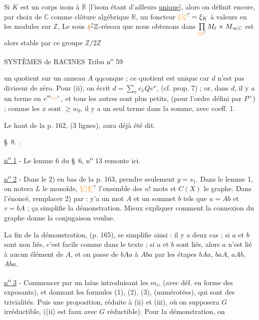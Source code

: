 Si $K$ est un corps  isom à $\mathbb R$ [l'isom étant d'ailleurs \uline{unique}], alors on définit encore, par choix de $\mathbb C$ comme  clôture algébrique  $\mathbb R$, un foncteur $\unsure{\xi|\zeta}=\xi_K$ à valeurs en les modules sur $\mathbb Z$,   Le sous $\deleted{\unsure{\xi}}\mathbb Z$-réseau  que nous obtenons dans $\prod\limits_{\unsure{\ell|l}} M_\ell\times M_\infty{}_{\mathbb C}$  est alors stable par ce groupe $\mathbb Z/2\mathbb Z$

SYSTÈMES de RACINES \hfill Tribu n\textsuperscript{o} 59

un quotient sur un anneau $A$ qqconque ; ce quotient est unique car $d$ n'est pas diviseur de zéro. Pour (ii), on écrit $d=\sum\limits_x c_x Qe^x$, (cf. prop. 7) ; or, dans $d$, il y a un terme en $e^{w_{\unsure{0|o}}}$, et tous les autres sont plus petits, (pour l'ordre défini par $P^+$) ; comme les $x$ sont $\geq w_0$, il y a un seul terme dans la somme, avec coeff. 1.

Le haut de la p. 162, (3 lignes), aura déjà été dit.

\S~8. .

\uline{n\textsuperscript{o} 1} - Le lemme 6 du \S~6, n\textsuperscript{o} 13 remonte ici.

\uline{n\textsuperscript{o} 2} - Dans le 2) en bas de la p. 163, prendre seulement $g=s_1$. Dans le lemme 1, on notera $L$ le monoïde, $\unsure{\underline V|\underline Y}$ l'ensemble des $n!$ mots et $C(X)$ le graphe. Dans l'énoncé, remplacer 2) par : \textquotedbl{} y'a un mot $A$ et un sommet $b$ tels que $u=Ab$ et $v=bA$ \textquotedbl{} ; ça simplifie la démonstration. Mieux expliquer comment la connexion du graphe donne la conjugaison voulue.

La fin de la démonstration, (p. 165), se simplifie ainsi : il y a deux cas ; si $a$ et $b$ sont non liés, c'est facile comme dans le texte ; si $a$ et $b$ sont liés, alors $a$ n'est lié à aucun élément de $A$, et on passe de $bAa$ à $Aba$ par les étapes $bAa$, $baA$, $aAb$, $Aba$.

\uline{n\textsuperscript{o} 3} - Commencer par un laïus introduisant les $m_i$, (avec déf. en forme des exposants), et donnant les formules (1), (2), (3), (numérotées), qui sont des trivialités. Puis une proposition, réduite à (ii) et (iii), où on supposera $G$ irréductible, ((ii) est faux avec $G$ réductible). Pour la démonstration, on

